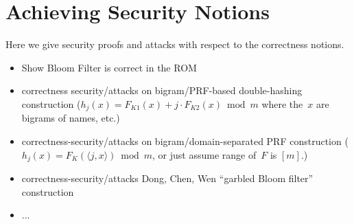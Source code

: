 \section{Achieving Security Notions}

  Here we give security proofs and attacks with respect to the correctness notions.
\begin{itemize}
\item Show Bloom Filter is correct in the ROM %
\item correctness security/attacks on bigram/PRF-based double-hashing construction ($h_j(x) = F_{K1}(x) + j\cdot F_{K2}(x) \bmod m$ where the~$x$ are bigrams of names, etc.) 
\item correctness-security/attacks on bigram/domain-separated PRF construction ($h_j(x)=F_K(\langle j,x \rangle) \bmod m$, or just assume range of~$F$ is $[m]$.)
\item correctness-security/attacks Dong, Chen, Wen ``garbled Bloom filter'' construction
\item ...
\end{itemize}

